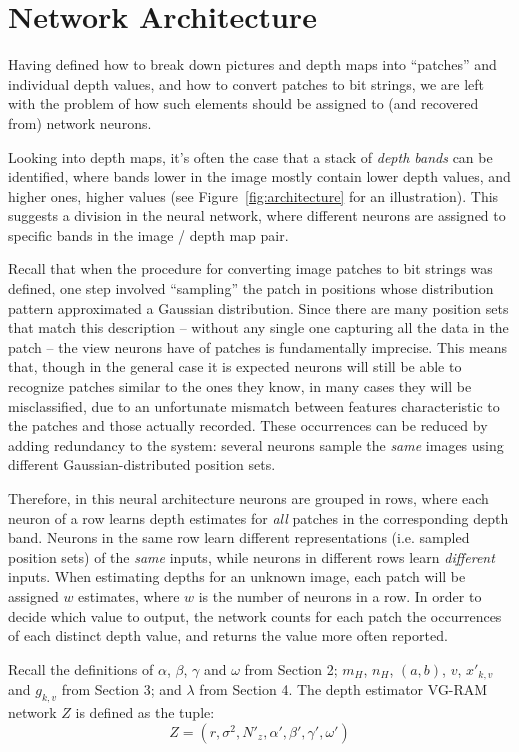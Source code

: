 \documentclass[twocolumn, 9pt]{jsproceedings}
\begin{document}
\section{Network Architecture}

Having defined how to break down pictures and depth maps into ``patches'' and individual depth values, and how to convert patches to bit strings, we are left with the problem of how such elements should be assigned to (and recovered from) network neurons.

Looking into depth maps, it's often the case that a stack of {\it depth bands} can be identified, where bands lower in the image mostly contain lower depth values, and higher ones, higher values (see Figure~\ref{fig:architecture} for an illustration). This suggests a division in the neural network, where different neurons are assigned to specific bands in the image / depth map pair.

Recall that when the procedure for converting image patches to bit strings was defined, one step involved ``sampling'' the patch in positions whose distribution pattern approximated a Gaussian distribution. Since there are many position sets that match this description -- without any single one capturing all the data in the patch -- the view neurons have of patches is fundamentally imprecise. This means that, though in the general case it is expected neurons will still be able to recognize patches similar to the ones they know, in many cases they will be misclassified, due to an unfortunate mismatch between features characteristic to the patches and those actually recorded. These occurrences can be reduced by adding redundancy to the system: several neurons sample the {\it same} images using different Gaussian-distributed position sets.

Therefore, in this neural architecture neurons are grouped in rows, where each neuron of a row learns depth estimates for {\it all} patches in the corresponding depth band. Neurons in the same row learn different representations (i.e. sampled position sets) of the {\it same} inputs, while neurons in different rows learn {\it different} inputs. When estimating depths for an unknown image, each patch will be assigned \(w\) estimates, where \(w\) is the number of neurons in a row. In order to decide which value to output, the network counts for each patch the occurrences of each distinct depth value, and returns the value more often reported.

Recall the definitions of \(\alpha\), \(\beta\), \(\gamma\) and \(\omega\) from Section 2; \(m_H\), \(n_H\), \((a, b)\), \(v\), \(x'_{k,v}\) and \(g_{k,v}\) from Section 3; and \(\lambda\) from Section 4. The depth estimator VG-RAM network \(Z\) is defined as the tuple:
\begin{equation}
Z = (r, \sigma^2, N'_z, \alpha', \beta', \gamma', \omega')
\end{equation}
\end{document}
